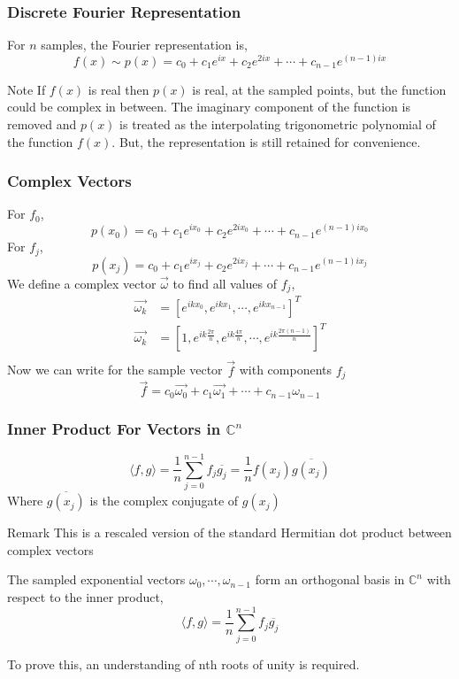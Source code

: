 \documentclass{beamer}
\begin{document}
\begin{frame}
	\frametitle{Discrete Fourier Representation}
	For $n$ samples, the Fourier representation is,
	\[
			f(x) \sim p(x) = c_0 + c_1 e^{ix} + c_2 e^{2ix} + \cdots + c_{n-1}e^{(n-1)ix}
	\]
	\pause
	\begin{block}{Note}
			If $f(x)$ is real then $p(x)$ is real, at the sampled points, but the function could be complex in between. The imaginary component of the function is removed and $p(x)$ is treated as the interpolating trigonometric polynomial of the function $f(x)$. But, the representation is still retained for convenience.

	\end{block}
\end{frame}
\begin{frame}
	\frametitle{Complex Vectors}
	For $f_0$,
	\[
		p(x_0) = c_0 + c_1 e^{ix_0} + c_2 e^{2ix_0} + \cdots + c_{n-1}e^{(n-1)ix_0}
	\]
	\pause
	For $f_j$,
	\[
		p(x_j) = c_0 + c_1 e^{ix_j} + c_2 e^{2ix_j} + \cdots + c_{n-1}e^{(n-1)ix_j}
	\]
	\pause
	We define a complex vector $\vec{\omega}$ to find all values of $f_j$,
	\begin{align*}
		\vec{\omega_k} &= [e^{i k x_0},e^{ik x_1},\cdots,e^{ik x_{n-1}}]^T \\
		\vec{\omega_k} &= [1,e^{i k \frac{2\pi}{n}},e^{ik \frac{4\pi}{n}},\cdots,e^{ik \frac{2\pi(n-1)}{n}}]^T \\
	\end{align*}
	\pause
	Now we can write for the sample vector $\vec{f}$ with components $f_j$
	\[
		\vec{f} = c_0 \vec{\omega_0} + c_1 \vec{\omega_1} + \cdots + c_{n-1}\omega_{n-1}
	\]
\end{frame}
\begin{frame}
	\frametitle{Inner Product For Vectors in $\mathbb{C}^n$}
	\[
			\langle f,g \rangle = \frac{1}{n} \sum_{j = 0}^{n-1} f_j \overline{g_j} = \frac{1}{n} f(x_j) \overline{g(x_j)}
	\]
	Where $\overline{g(x_j)}$ is the complex conjugate of $g(x_j)$
	\begin{block}{Remark}
		This is a rescaled version of the standard Hermitian dot product between complex vectors
	\end{block}
\end{frame}
\begin{frame}
	\begin{theorem}
			The sampled exponential vectors $\omega_0, \cdots , \omega_{n-1}$ form an orthogonal basis in $\mathbb{C}^n$ with respect to the inner product,
	\[
		\langle f,g \rangle = \frac{1}{n} \sum_{j=0}^{n-1} f_j \overline{g_j}
	\]
	\end{theorem}
	To prove this, an understanding of nth roots of unity is required.
\end{frame}
\end{document}

